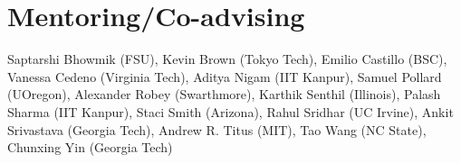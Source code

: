 \section{Mentoring/Co-advising}
		{Saptarshi Bhowmik (FSU),
    Kevin Brown (Tokyo Tech),
    Emilio Castillo (BSC),
    Vanessa Cedeno (Virginia Tech),
    Aditya Nigam (IIT Kanpur),
    Samuel Pollard (UOregon),
    Alexander Robey (Swarthmore),
    Karthik Senthil (Illinois),
    Palash Sharma (IIT Kanpur),
    Staci Smith (Arizona),
    Rahul Sridhar (UC Irvine),
    Ankit Srivastava (Georgia Tech),
    Andrew R. Titus (MIT),
    Tao Wang (NC State),
    Chunxing Yin (Georgia Tech)}
